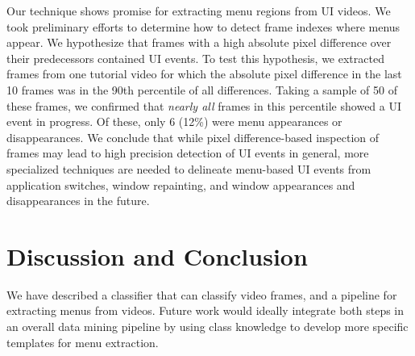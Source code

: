 \documentclass[10pt]{article}
\begin{document}
Our technique shows promise for extracting menu regions from UI videos.  We took preliminary efforts
to determine how to detect frame indexes where menus appear.  We hypothesize that frames with a 
high absolute pixel difference over their predecessors contained UI events.  To test this hypothesis, 
we extracted frames from one tutorial video for which the absolute pixel difference in the last 10
frames was in the 90th percentile of all differences.  Taking a sample of 50 of these frames, we confirmed that
\emph{nearly all} frames in this percentile showed a UI event in progress.  Of these, only 6 (12\%) 
were menu appearances or disappearances.  We conclude that while pixel difference-based inspection of frames may lead to
high precision detection of UI events in general, more specialized techniques are needed to
delineate menu-based UI events from application switches, window repainting, and window
appearances and disappearances in the future.

\section{Discussion and Conclusion}

We have described a classifier that can classify video frames, and a pipeline for extracting menus
from videos. Future work would ideally integrate both steps in an overall data mining pipeline by
using class knowledge to develop more specific templates for menu extraction.

\printbibliography
\end{document}
